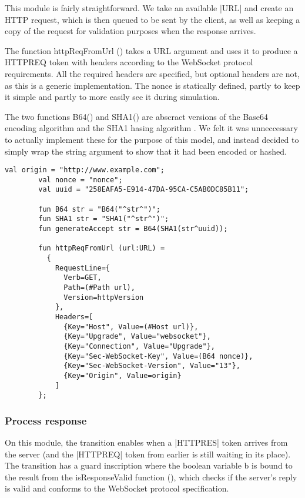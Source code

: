 		This module is fairly straightforward. We take an available |URL|
		and create an HTTP request, which is then queued to be sent by the
		client, as well as keeping a copy of the request for validation purposes when
		the response arrives.
		
		The function httpReqFromUrl () takes a URL argument and
		uses it to produce a HTTPREQ token with headers according to the WebSocket protocol requirements.
		All the required headers are specified, but optional headers are not, as this
		is a generic implementation. The nonce is statically defined, partly to keep
		it simple and partly to more easily see it during simulation. 

		The two functions B64() and SHA1() are
		abscract versions of the Base64 encoding algorithm \cite{rfc4648} and the SHA1
		hasing algorithm \cite{fips.180-2}. We felt it was unneccessary to actually
		implement these for the purpose of this model, and instead decided to
		simply wrap the string argument to show that it had been encoded or hashed.
		
		\begin{lstlisting}[label=lst:httpReqFromUrl,caption=httpReqFromUrl,gobble=2,float]
		val origin = "http://www.example.com";
		val nonce = "nonce";
		val uuid = "258EAFA5-E914-47DA-95CA-C5AB0DC85B11";
		
		fun B64 str = "B64("^str^")";
		fun SHA1 str = "SHA1("^str^")";
		fun generateAccept str = B64(SHA1(str^uuid));
		
		fun httpReqFromUrl (url:URL) = 
          {
            RequestLine={
              Verb=GET, 
              Path=(#Path url),
              Version=httpVersion
            },
            Headers=[
              {Key="Host", Value=(#Host url)},
              {Key="Upgrade", Value="websocket"},
              {Key="Connection", Value="Upgrade"},
              {Key="Sec-WebSocket-Key", Value=(B64 nonce)},
              {Key="Sec-WebSocket-Version", Value="13"},
              {Key="Origin", Value=origin}
            ]
		};
		\end{lstlisting}
		
		
		
	\subsubsection{Process response}
		
		
		On this module, the transition enables when a |HTTPRES| token arrives from
		the server (and the |HTTPREQ| token from earlier is still waiting in its
		place). The transition has a guard inscription where the boolean variable b is
		bound to the result from the isResponseValid function
		(), which checks if the server's reply is valid and
		conforms to the WebSocket protocol specification.
		
